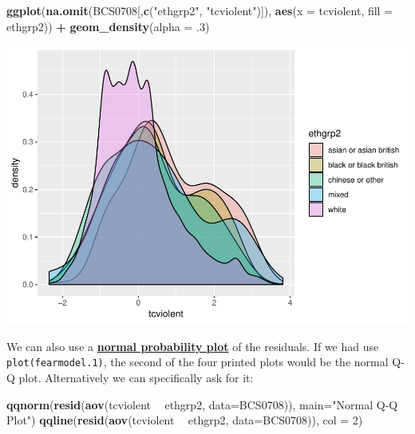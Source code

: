 \documentclass[]{book}
\newenvironment{Shaded}{\begin{snugshade}}{\end{snugshade}}
\newcommand{\DataTypeTok}[1]{\textcolor[rgb]{0.13,0.29,0.53}{#1}}
\newcommand{\DecValTok}[1]{\textcolor[rgb]{0.00,0.00,0.81}{#1}}
\newcommand{\FloatTok}[1]{\textcolor[rgb]{0.00,0.00,0.81}{#1}}
\newcommand{\KeywordTok}[1]{\textcolor[rgb]{0.13,0.29,0.53}{\textbf{#1}}}
\newcommand{\NormalTok}[1]{#1}
\newcommand{\OperatorTok}[1]{\textcolor[rgb]{0.81,0.36,0.00}{\textbf{#1}}}
\newcommand{\StringTok}[1]{\textcolor[rgb]{0.31,0.60,0.02}{#1}}
\theoremstyle{definition}
\theoremstyle{definition}
\theoremstyle{definition}
\theoremstyle{remark}
\begin{document}
\begin{Shaded}
\begin{Highlighting}[]
\KeywordTok{ggplot}\NormalTok{(}\KeywordTok{na.omit}\NormalTok{(BCS0708[,}\KeywordTok{c}\NormalTok{(}\StringTok{"ethgrp2"}\NormalTok{, }\StringTok{"tcviolent"}\NormalTok{)]), }\KeywordTok{aes}\NormalTok{(}\DataTypeTok{x =}\NormalTok{ tcviolent, }\DataTypeTok{fill =}\NormalTok{ ethgrp2)) }\OperatorTok{+}\StringTok{ }
\StringTok{  }\KeywordTok{geom_density}\NormalTok{(}\DataTypeTok{alpha =} \FloatTok{.3}\NormalTok{)}
\end{Highlighting}
\end{Shaded}

\includegraphics{06-hypothesis_testing_files/figure-latex/unnamed-chunk-14-1.pdf}

We can also use a
\href{http://en.wikipedia.org/wiki/Normal_probability_plot}{\textbf{normal
probability plot}} of the residuals. If we had use
\texttt{plot(fearmodel.1)}, the second of the four printed plots would
be the normal Q-Q plot. Alternatively we can specifically ask for it:

\begin{Shaded}
\begin{Highlighting}[]
\KeywordTok{qqnorm}\NormalTok{(}\KeywordTok{resid}\NormalTok{(}\KeywordTok{aov}\NormalTok{(tcviolent }\OperatorTok{~}\StringTok{ }\NormalTok{ethgrp2, }\DataTypeTok{data=}\NormalTok{BCS0708)), }\DataTypeTok{main=}\StringTok{"Normal Q-Q Plot"}\NormalTok{)}
\KeywordTok{qqline}\NormalTok{(}\KeywordTok{resid}\NormalTok{(}\KeywordTok{aov}\NormalTok{(tcviolent }\OperatorTok{~}\StringTok{ }\NormalTok{ethgrp2, }\DataTypeTok{data=}\NormalTok{BCS0708)), }\DataTypeTok{col =} \DecValTok{2}\NormalTok{)}
\end{Highlighting}
\end{Shaded}
\end{document}
